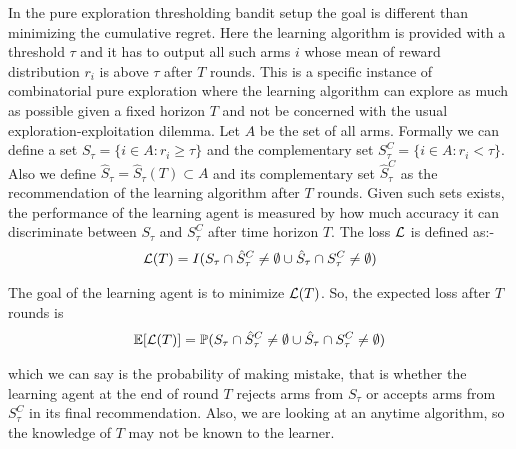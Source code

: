 	In the pure exploration thresholding bandit setup the goal is different than minimizing the cumulative regret. Here the learning algorithm is provided with a threshold $\tau$ and it has to output all such arms $i$ whose mean of reward distribution $r_{i}$ is above $\tau$ after $T$ rounds. This is a specific instance of combinatorial pure exploration where the learning algorithm can explore as much as possible given a fixed horizon $T$ and not be concerned with the usual exploration-exploitation dilemma. Let $A$ be the set of all arms. Formally we can define a set $S_{\tau}=\lbrace i\in A: r_{i}\geq \tau \rbrace$ and the complementary set $S_{\tau}^{C}=\lbrace i\in A: r_{i} < \tau \rbrace$. Also we define $\hat{S}_{\tau}=\hat{S}_{\tau}(T)\subset A$ and its complementary set $\hat{S}_{\tau}^{C}$ as the recommendation of the learning algorithm after $T$ rounds. Given such sets exists, the performance of the learning agent is measured by how much accuracy it can discriminate between $S_{\tau}$ and $S_{\tau}^{C}$ after time horizon $T$. The loss $\mathcal{L}$ is defined as:-
\begin{align*}
\mathcal{L} (T) = I(S_{\tau}\cap \hat{S}_{\tau}^{C}\neq \emptyset    \cup    \hat{S}_{\tau}\cap S_{\tau}^{C}\neq \emptyset)
\end{align*}	
		
The goal of the learning agent is to minimize $\mathcal{L} (T)$. So, the expected loss after $T$ rounds is 
\begin{align*}
\mathbb{E}[\mathcal{L}(T)] = \mathbb{P}(S_{\tau}\cap \hat{S}_{\tau}^{C} \neq \emptyset   \cup    \hat{S}_{\tau}\cap S_{\tau}^{C} \neq \emptyset)
\end{align*}

which we can say is the probability of making mistake, that is whether the learning agent at the end of round $T$ rejects arms from $S_{\tau}$ or accepts arms from $S_{\tau}^{C}$ in its final recommendation. Also, we are looking at an anytime algorithm, so the knowledge of $T$ may not be known to the learner.


%

                                                                                                                                         